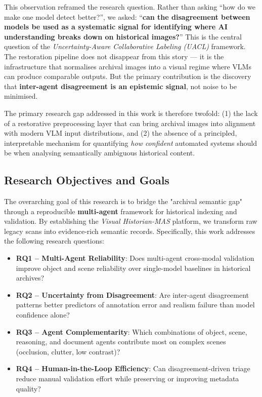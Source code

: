 \documentclass[12pt,onecolumn,a4paper]{IEEEtran}
\begin{document}
This observation reframed the research question. Rather than asking ``how do we make one model detect better?'', we asked: ``\textbf{can the disagreement between models be used as a systematic signal for identifying where AI understanding breaks down on historical images?}'' This is the central question of the \textit{Uncertainty-Aware Collaborative Labeling (UACL)} framework. The restoration pipeline does not disappear from this story --- it is the infrastructure that normalises archival images into a visual regime where VLMs can produce comparable outputs. But the primary contribution is the discovery that \textbf{inter-agent disagreement is an epistemic signal}, not noise to be minimised.

The primary research gap addressed in this work is therefore twofold: (1) the lack of a restorative preprocessing layer that can bring archival images into alignment with modern VLM input distributions, and (2) the absence of a principled, interpretable mechanism for quantifying \textit{how confident} automated systems should be when analysing semantically ambiguous historical content.

\subsection{Research Objectives and Goals}
The overarching goal of this research is to bridge the "archival semantic gap" through a reproducible \textbf{multi-agent} framework for historical indexing and validation. By establishing the \textit{Visual Historian-MAS} platform, we transform raw legacy scans into evidence-rich semantic records. Specifically, this work addresses the following research questions:
\begin{itemize}
    \item \textbf{RQ1 -- Multi-Agent Reliability}: Does multi-agent cross-modal validation improve object and scene reliability over single-model baselines in historical archives?
    \item \textbf{RQ2 -- Uncertainty from Disagreement}: Are inter-agent disagreement patterns better predictors of annotation error and realism failure than model confidence alone?
    \item \textbf{RQ3 -- Agent Complementarity}: Which combinations of object, scene, reasoning, and document agents contribute most on complex scenes (occlusion, clutter, low contrast)?
    \item \textbf{RQ4 -- Human-in-the-Loop Efficiency}: Can disagreement-driven triage reduce manual validation effort while preserving or improving metadata quality?
\end{itemize}
\end{document}
